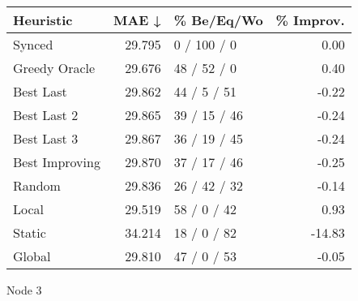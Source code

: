 \begin{tabular}{lrlr}
\toprule
\textbf{Heuristic} & \textbf{MAE ↓} & \textbf{\% Be/Eq/Wo} & \textbf{\% Improv.} \\
\midrule
            Synced &         29.795 &          0 / 100 / 0 &                0.00 \\
     Greedy Oracle &         29.676 &          48 / 52 / 0 &                0.40 \\
         Best Last &         29.862 &          44 / 5 / 51 &               -0.22 \\
       Best Last 2 &         29.865 &         39 / 15 / 46 &               -0.24 \\
       Best Last 3 &         29.867 &         36 / 19 / 45 &               -0.24 \\
    Best Improving &         29.870 &         37 / 17 / 46 &               -0.25 \\
            Random &         29.836 &         26 / 42 / 32 &               -0.14 \\
             Local &         29.519 &          58 / 0 / 42 &                0.93 \\
            Static &         34.214 &          18 / 0 / 82 &              -14.83 \\
            Global &         29.810 &          47 / 0 / 53 &               -0.05 \\
\bottomrule
\end{tabular}
\caption{Node 3}
\label{tab:non_lr01_le1_bs4_3}
